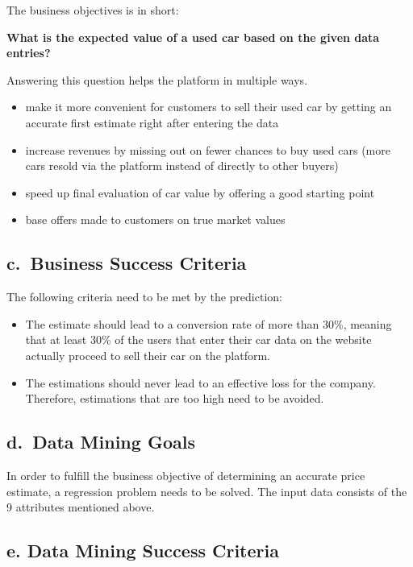 \documentclass[sigchi]{acmart}
\def\tightlist{}
\begin{document}
The business objectives is in short:

\textbf{What is the expected value of a used car based on the given data entries?}

Answering this question helps the platform in multiple ways.

\begin{itemize}
\tightlist
\item
  make it more convenient for customers to sell their used car by getting an accurate first estimate right after entering the data
\item
  increase revenues by missing out on fewer chances to buy used cars (more cars resold via the platform instead of directly to other buyers)
\item
  speed up final evaluation of car value by offering a good starting point
\item
  base offers made to customers on true market values
\end{itemize}

\hypertarget{c.-business-success-criteria}{%
\subsection{c.~Business Success Criteria}\label{c.-business-success-criteria}}

The following criteria need to be met by the prediction:

\begin{itemize}
\item
  The estimate should lead to a conversion rate of more than 30\%, meaning that at least 30\% of the users that enter their car data on the website actually proceed to sell their car on the platform.
\item
  The estimations should never lead to an effective loss for the company. Therefore, estimations that are too high need to be avoided.
\end{itemize}

\hypertarget{d.-data-mining-goals}{%
\subsection{d.~Data Mining Goals}\label{d.-data-mining-goals}}

In order to fulfill the business objective of determining an accurate price estimate, a regression problem needs to be solved. The input data consists of the 9 attributes mentioned above.

\hypertarget{e.-data-mining-success-criteria}{%
\subsection{e. Data Mining Success Criteria}\label{e.-data-mining-success-criteria}}
\end{document}
